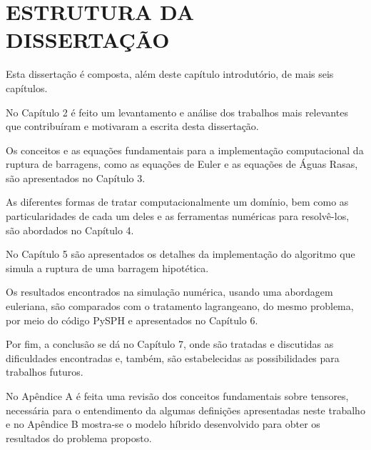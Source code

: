 \section{ESTRUTURA DA DISSERTAÇÃO}

Esta dissertação é composta, além deste capítulo introdutório, de mais seis capítulos.

No Capítulo 2 é feito um levantamento e análise dos trabalhos mais relevantes que contribuíram e motivaram a escrita desta dissertação.

Os conceitos e as equações fundamentais para a implementação computacional da ruptura de barragens, como as equações de Euler e as equações de Águas Rasas, são apresentados no Capítulo 3.

As diferentes formas de tratar computacionalmente um domínio, bem como as particularidades de cada um deles e as ferramentas numéricas para resolvê-los, são abordados no Capítulo 4.

No Capítulo 5 são apresentados os detalhes da implementação do algoritmo que simula a ruptura de uma barragem hipotética.

Os resultados encontrados na simulação numérica, usando uma abordagem euleriana, são comparados com o tratamento lagrangeano, do mesmo problema, por meio do código PySPH e apresentados no Capítulo 6.

Por fim, a conclusão se dá no Capítulo 7, onde são tratadas e discutidas as dificuldades encontradas e, também, são estabelecidas as possibilidades para trabalhos futuros.

No Apêndice A é feita uma revisão dos conceitos fundamentais sobre tensores, necessária para o entendimento da algumas definições apresentadas neste trabalho e no Apêndice B mostra-se o modelo híbrido desenvolvido para obter os resultados do problema proposto.     


